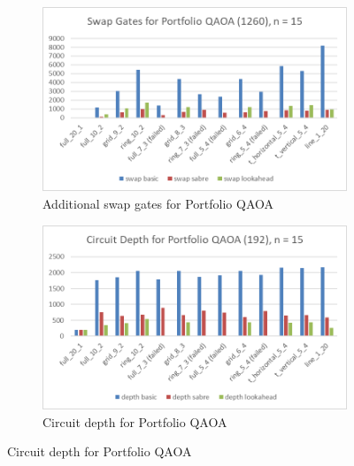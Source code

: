 \begin{figure}[htb]
    \centering
    \begin{subfigure}{0.48\linewidth}
        \includegraphics[width=\linewidth]{image/chart_portfolioqaoa.png}
        \caption{Additional swap gates for Portfolio QAOA}
        \label{fig:chart-portfolioqaoa}
    \end{subfigure}
    \begin{subfigure}{0.48\linewidth}
        \includegraphics[width=\linewidth]{image/chart_portfolioqaoa_depth.png}
        \caption{Circuit depth for Portfolio QAOA}
        \label{fig:chart-portfolioqaoa-depth}
    \end{subfigure}
\end{figure}
